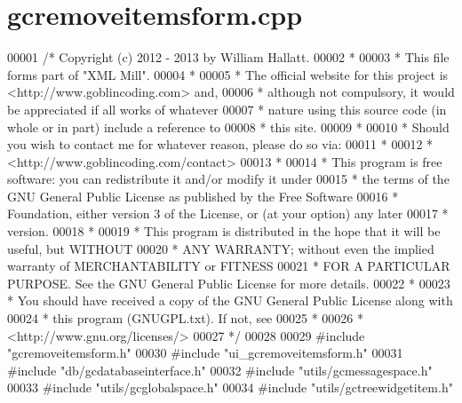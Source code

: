 \hypertarget{gcremoveitemsform_8cpp_source}{\section{gcremoveitemsform.\-cpp}
}

\begin{DoxyCode}
00001 \textcolor{comment}{/* Copyright (c) 2012 - 2013 by William Hallatt.}
00002 \textcolor{comment}{ *}
00003 \textcolor{comment}{ * This file forms part of "XML Mill".}
00004 \textcolor{comment}{ *}
00005 \textcolor{comment}{ * The official website for this project is <http://www.goblincoding.com> and,}
00006 \textcolor{comment}{ * although not compulsory, it would be appreciated if all works of whatever}
00007 \textcolor{comment}{ * nature using this source code (in whole or in part) include a reference to}
00008 \textcolor{comment}{ * this site.}
00009 \textcolor{comment}{ *}
00010 \textcolor{comment}{ * Should you wish to contact me for whatever reason, please do so via:}
00011 \textcolor{comment}{ *}
00012 \textcolor{comment}{ *                 <http://www.goblincoding.com/contact>}
00013 \textcolor{comment}{ *}
00014 \textcolor{comment}{ * This program is free software: you can redistribute it and/or modify it
       under}
00015 \textcolor{comment}{ * the terms of the GNU General Public License as published by the Free
       Software}
00016 \textcolor{comment}{ * Foundation, either version 3 of the License, or (at your option) any later}
00017 \textcolor{comment}{ * version.}
00018 \textcolor{comment}{ *}
00019 \textcolor{comment}{ * This program is distributed in the hope that it will be useful, but WITHOUT}
00020 \textcolor{comment}{ * ANY WARRANTY; without even the implied warranty of MERCHANTABILITY or
       FITNESS}
00021 \textcolor{comment}{ * FOR A PARTICULAR PURPOSE.  See the GNU General Public License for more
       details.}
00022 \textcolor{comment}{ *}
00023 \textcolor{comment}{ * You should have received a copy of the GNU General Public License along with}
00024 \textcolor{comment}{ * this program (GNUGPL.txt).  If not, see}
00025 \textcolor{comment}{ *}
00026 \textcolor{comment}{ *                    <http://www.gnu.org/licenses/>}
00027 \textcolor{comment}{ */}
00028 
00029 \textcolor{preprocessor}{#include "gcremoveitemsform.h"}
00030 \textcolor{preprocessor}{#include "ui\_gcremoveitemsform.h"}
00031 \textcolor{preprocessor}{#include "db/gcdatabaseinterface.h"}
00032 \textcolor{preprocessor}{#include "utils/gcmessagespace.h"}
00033 \textcolor{preprocessor}{#include "utils/gcglobalspace.h"}
00034 \textcolor{preprocessor}{#include "utils/gctreewidgetitem.h"}

\end{DoxyCode}
